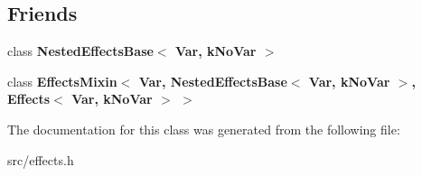 \subsection*{Friends}
\begin{DoxyCompactItemize}
\item 
\hypertarget{classv8_1_1internal_1_1_effects_base_ab162a9ef7065fbbada1e8cba47e4431d}{}class {\bfseries Nested\+Effects\+Base$<$ Var, k\+No\+Var $>$}\label{classv8_1_1internal_1_1_effects_base_ab162a9ef7065fbbada1e8cba47e4431d}

\item 
\hypertarget{classv8_1_1internal_1_1_effects_base_a4453a632029cb5c80a2df00b9b2adb67}{}class {\bfseries Effects\+Mixin$<$ Var, Nested\+Effects\+Base$<$ Var, k\+No\+Var $>$, Effects$<$ Var, k\+No\+Var $>$ $>$}\label{classv8_1_1internal_1_1_effects_base_a4453a632029cb5c80a2df00b9b2adb67}

\end{DoxyCompactItemize}


The documentation for this class was generated from the following file\+:\begin{DoxyCompactItemize}
\item 
src/effects.\+h\end{DoxyCompactItemize}
